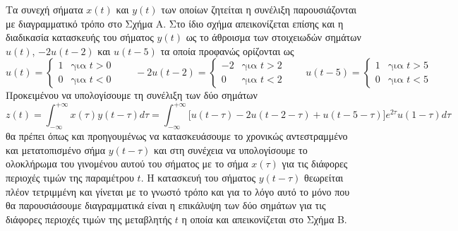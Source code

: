 \documentclass[a4paper,twoside,10pt,openany]{memoir}
\theoremstyle{dotless}
\begin{document}
\begin{solution}
Τα συνεχή σήματα $x(t)$ και $y(t)$ των οποίων ζητείται η συνέλιξη παρουσιάζονται με διαγραμματικό τρόπο στο Σχήμα Α. Στο ίδιο σχήμα απεικονίζεται επίσης και η διαδικασία κατασκευής του σήματος $y(t)$ ως το άθροισμα των στοιχειωδών σημάτων $u(t)$, $-2u(t-2)$ και $u(t-5)$ τα οποία προφανώς ορίζονται ως
\begin{equation*}
u(t)=\left\{\begin{array}{ll}1&\mbox{για }t>0\\[5pt]0&\mbox{για }t<0\end{array}\right.\qquad
-2u(t-2)=\left\{\begin{array}{rl}-2&\mbox{για }t>2\\[5pt]0&\mbox{για }t<2\end{array}\right.\qquad
u(t-5)=\left\{\begin{array}{ll}1&\mbox{για }t>5\\[5pt]0&\mbox{για }t<5\end{array}\right.
\end{equation*}
Προκειμένου να υπολογίσουμε τη συνέλιξη των δύο σημάτων
\begin{equation*}
z(t)=\int_{-\infty}^{+\infty}x(\tau)y(t-\tau)d\tau=\int_{-\infty}^{+\infty}\bigg[u(t-\tau)-2u(t-2-\tau)+u(t-5-\tau)\bigg]e^{2\tau}u(1-\tau)d\tau
\end{equation*}
θα πρέπει όπως και προηγουμένως να κατασκευάσουμε το χρονικώς αντεστραμμένο και μετατοπισμένο σήμα $y(t-\tau)$ και στη συνέχεια να υπολογίσουμε το ολοκλήρωμα του γινομένου αυτού του σήματος με το σήμα $x(\tau)$ για τις διάφορες περιοχές τιμών της παραμέτρου $t$. Η κατασκευή του σήματος $y(t-\tau)$ θεωρείται πλέον τετριμμένη και γίνεται με το γνωστό τρόπο και για το λόγο αυτό το μόνο που θα παρουσιάσουμε διαγραμματικά είναι η επικάλυψη των δύο σημάτων για τις διάφορες περιοχές τιμών της μεταβλητής $t$ η οποία και απεικονίζεται στο Σχήμα Β.


\end{solution}
\end{document}

